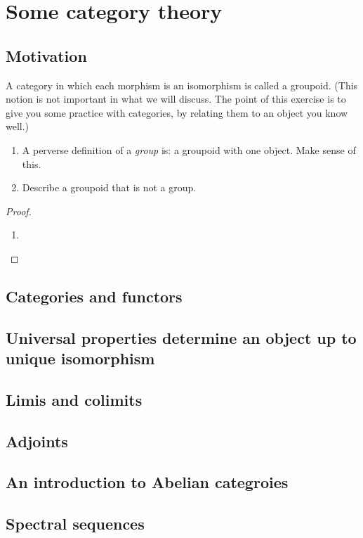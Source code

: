 \chapter{Some category theory}

\section{Motivation}
\begin{exr}
A category in which each morphism is an isomorphism is called a groupoid. (This notion is not important in what we will discuss. The point of this exercise is to give you some practice with categories, by relating them to an object you know well.)
\begin{enumerate}[label=(\alph*)]
\item A perverse definition of a \textit{group} is: a groupoid with one object. Make sense of this.
\item Describe a groupoid that is not a group.
\end{enumerate}
\end{exr}
\begin{proof}
\begin{enumerate}[label=(\alph*)]
\item 
\end{enumerate}
\end{proof}
\section{Categories and functors}

\section{Universal properties determine an object up to unique isomorphism}

\section{Limis and colimits}

\section{Adjoints}

\section{An introduction to Abelian categroies}

\section{Spectral sequences}